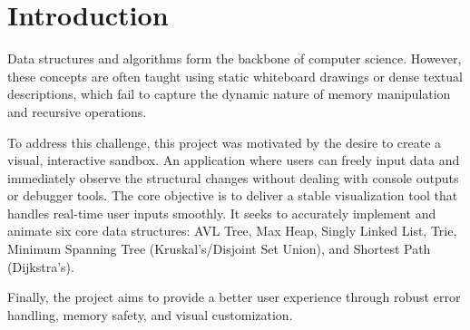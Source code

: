 \section{Introduction}
Data structures and algorithms form the backbone of computer science. However, these concepts are often taught using static whiteboard drawings or dense textual descriptions, which fail to capture the dynamic nature of memory manipulation and recursive operations. 

To address this challenge, this project was motivated by the desire to create a visual, interactive sandbox. An application where users can freely input data and immediately observe the structural changes without dealing with console outputs or debugger tools. The core objective is to deliver a stable visualization tool that handles real-time user inputs smoothly. It seeks to accurately implement and animate six core data structures: AVL Tree, Max Heap, Singly Linked List, Trie, Minimum Spanning Tree (Kruskal's/Disjoint Set Union), and Shortest Path (Dijkstra's). 

Finally, the project aims to provide a better user experience through robust error handling, memory safety, and visual customization.